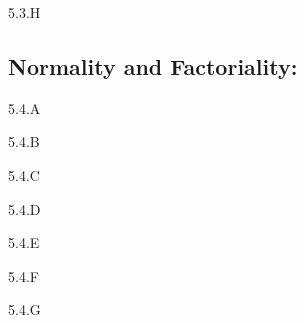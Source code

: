 \begin{exercise}{5.3.H}

\end{exercise}
\begin{solution}
    \todo{}
\end{solution}

\subsection{Normality and Factoriality:}

\begin{exercise}{5.4.A}
\end{exercise}
\begin{solution}
    \todo{}
\end{solution}

\begin{exercise}{5.4.B}

\end{exercise}
\begin{solution}
    \todo{}
\end{solution}

\begin{exercise}{5.4.C}

\end{exercise}
\begin{solution}
    \todo{}
\end{solution}

\begin{exercise}{5.4.D}
\end{exercise}
\begin{solution}
    \todo{}
\end{solution}

\begin{exercise}{5.4.E}

\end{exercise}
\begin{solution}
    \todo{}
\end{solution}

\begin{exercise}{5.4.F}

\end{exercise}
\begin{solution}
    \todo{}
\end{solution}

\begin{exercise}{5.4.G}

\end{exercise}
\begin{solution}
    \todo{}
\end{solution}


